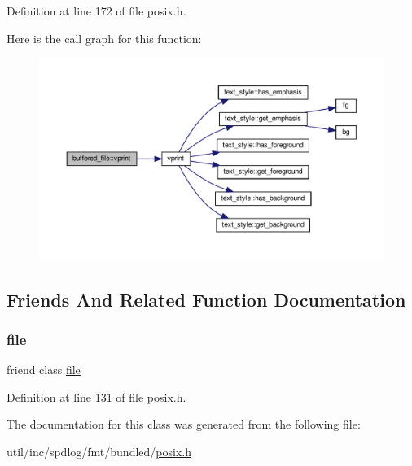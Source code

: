 Definition at line 172 of file posix.\+h.

Here is the call graph for this function\+:
\nopagebreak
\begin{figure}[H]
\begin{center}
\leavevmode
\includegraphics[width=350pt]{classbuffered__file_a0a34fceffc31cc126a6b731461c88d8d_cgraph}
\end{center}
\end{figure}


\subsection{Friends And Related Function Documentation}
\mbox{\label{classbuffered__file_a686a90482e62dd1618201a3c79f9aae6}} 
\subsubsection{\texorpdfstring{file}{file}}
{\footnotesize\ttfamily friend class \hyperlink{classfile}{file}\hspace{0.3cm}{\ttfamily [friend]}}



Definition at line 131 of file posix.\+h.



The documentation for this class was generated from the following file\+:\begin{DoxyCompactItemize}
\item 
util/inc/spdlog/fmt/bundled/\hyperlink{posix_8h}{posix.\+h}\end{DoxyCompactItemize}
